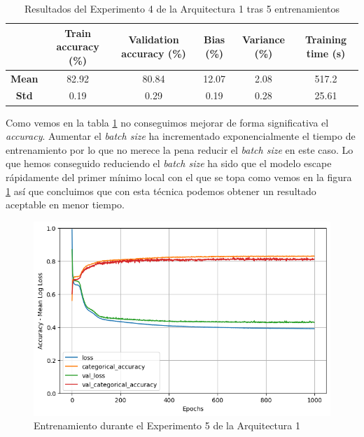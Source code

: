 \documentclass{article}
\begin{document}
			\begin{table}[!h]
				\begin{center}
					\begin{tabular}{ c | c | c | c | c | c |}
						\ & \textbf{Train accuracy (\%)} & \textbf{Validation accuracy (\%)} & \textbf{Bias (\%)} & \textbf{Variance (\%)} & \textbf{Training time (s)} \\ \hline
						\textbf{Mean} & 82.92 & 80.84 & 12.07 & 2.08 & 517.2\\ \hline
						\textbf{Std} & 0.19 & 0.29 & 0.19 & 0.28 & 25.61 \\ \hline
					\end{tabular}
					\caption{Resultados del Experimento 4 de la Arquitectura 1 tras 5 entrenamientos}
					\label{tab:res-d-a1-e5}
				\end{center}
			\end{table}
			Como vemos en la tabla \ref{tab:res-d-a1-e5} no conseguimos mejorar de forma significativa el \textit{accuracy}. Aumentar el \textit{batch size} ha incrementado exponencialmente el tiempo de entrenamiento por lo que no merece la pena reducir el \textit{batch size} en este caso. Lo que hemos conseguido reduciendo el \textit{batch size} ha sido que el modelo escape r\'apidamente del primer m\'inimo local con el que se topa como vemos en la figura \ref{d-tr-a1-e5} as\'i que concluimos que con esta t\'ecnica podemos obtener un resultado aceptable en menor tiempo.
			\begin{figure}[!h]
				\begin{center}
					\includegraphics[scale=0.5]{d-tr-a1-e5.png}		
					\caption{Entrenamiento durante el Experimento 5 de la Arquitectura 1}	
					\label{d-tr-a1-e5}
				\end{center}
			\end{figure}
			
\end{document}
